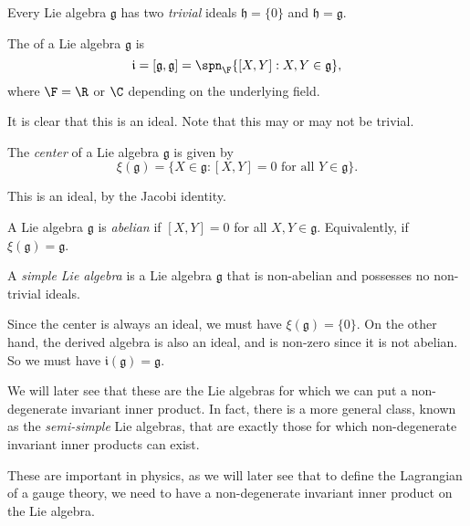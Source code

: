 \documentclass[a4paper]{article}
\begin{document}
\begin{eg}
  Every Lie algebra $\mathfrak{g}$ has two \emph{trivial} ideals $\mathfrak{h} = \{0\}$ and $\mathfrak{h} = \mathfrak{g}$.
\end{eg}

\begin{defi}
  The  of a Lie algebra $\mathfrak{g}$ is
  \[
    \mathfrak{i} = [\mathfrak{g}, \mathfrak{g}] = \spn_\F\{[X, Y]: X, Y \in \mathfrak{g}\},
  \]
  where $\F = \R$ or $\C$ depending on the underlying field.
\end{defi}
It is clear that this is an ideal. Note that this may or may not be trivial.

\begin{defi}
  The \emph{center} of a Lie algebra $\mathfrak{g}$ is given by
  \[
    \xi(\mathfrak{g}) = \{X \in \mathfrak{g}: [X, Y] = 0\text{ for all }Y \in \mathfrak{g}\}.
  \]
\end{defi}
This is an ideal, by the Jacobi identity.

\begin{defi}
  A Lie algebra $\mathfrak{g}$ is \emph{abelian} if $[X, Y] = 0$ for all $X, Y \in \mathfrak{g}$. Equivalently, if $\xi(\mathfrak{g}) = \mathfrak{g}$.
\end{defi}

\begin{defi}
  A \emph{simple Lie algebra} is a Lie algebra $\mathfrak{g}$ that is non-abelian and possesses no non-trivial ideals.
\end{defi}
Since the center is always an ideal, we must have $\xi(\mathfrak{g}) = \{0\}$. On the other hand, the derived algebra is also an ideal, and is non-zero since it is not abelian. So we must have $\mathfrak{i}(\mathfrak{g}) = \mathfrak{g}$.

We will later see that these are the Lie algebras for which we can put a non-degenerate invariant inner product. In fact, there is a more general class, known as the \emph{semi-simple} Lie algebras, that are exactly those for which non-degenerate invariant inner products can exist.

These are important in physics, as we will later see that to define the Lagrangian of a gauge theory, we need to have a non-degenerate invariant inner product on the Lie algebra.
\end{document}
